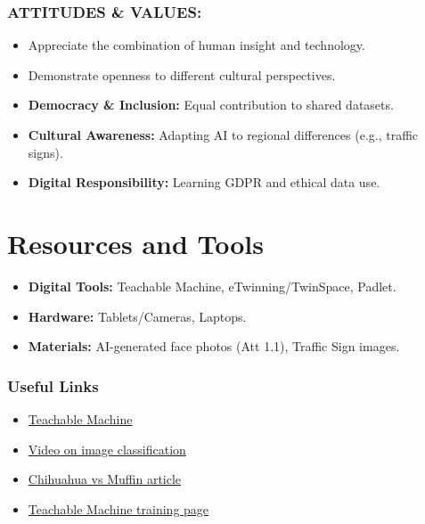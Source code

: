 \documentclass[11pt, a4paper]{article}
\begin{document}
\subsubsection*{ATTITUDES \& VALUES:}
\begin{itemize}
    \item Appreciate the combination of human insight and technology.
    \item Demonstrate openness to different cultural perspectives.
\end{itemize}

\begin{eurobox}
\begin{itemize}
    \item \textbf{Democracy \& Inclusion:} Equal contribution to shared datasets.
    \item \textbf{Cultural Awareness:} Adapting AI to regional differences (e.g., traffic signs).
    \item \textbf{Digital Responsibility:} Learning GDPR and ethical data use.
\end{itemize}
\end{eurobox}

\newpage
\section{Resources and Tools}
\begin{itemize}
    \item \textbf{Digital Tools:} Teachable Machine, eTwinning/TwinSpace, Padlet.
    \item \textbf{Hardware:} Tablets/Cameras, Laptops.
    \item \textbf{Materials:} AI-generated face photos (Att 1.1), Traffic Sign images.
\end{itemize}

\subsubsection*{Useful Links}
\begin{itemize}
    \item \href{https://teachablemachine.withgoogle.com/}{Teachable Machine}
    \item \href{https://www.youtube.com/watch?v=KzbleMu4sWo&ab_channel=ARCritic}{Video on image classification}
    \item \href{https://www.topbots.com/chihuahua-muffin-searching-best-computer-vision-api/}{Chihuahua vs Muffin article}
    \item \href{https://teachablemachine.withgoogle.com}{Teachable Machine training page}
\end{itemize}
\end{document}
